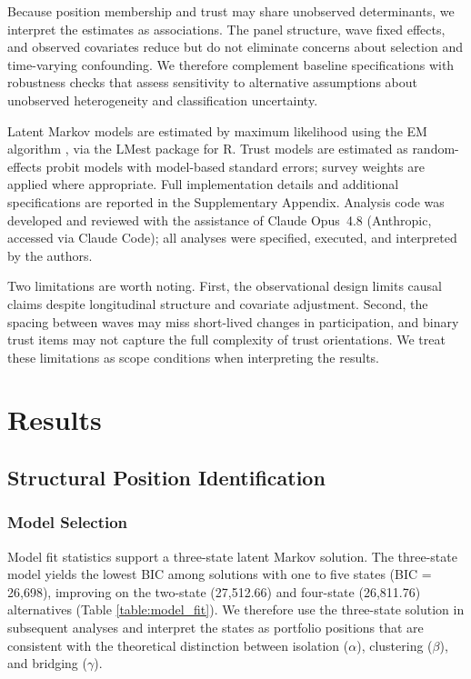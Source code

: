 Because position membership and trust may share unobserved determinants, we interpret the estimates as associations. The panel structure, wave fixed effects, and observed covariates reduce but do not eliminate concerns about selection and time-varying confounding. We therefore complement baseline specifications with robustness checks that assess sensitivity to alternative assumptions about unobserved heterogeneity and classification uncertainty.

Latent Markov models are estimated by maximum likelihood using the EM algorithm \parencite{bartolucci_latent_2013}, via the LMest package for R. Trust models are estimated as random-effects probit models with model-based standard errors; survey weights are applied where appropriate. Full implementation details and additional specifications are reported in the Supplementary Appendix. Analysis code was developed and reviewed with the assistance of Claude Opus~4.8 (Anthropic, accessed via Claude Code); all analyses were specified, executed, and interpreted by the authors.

Two limitations are worth noting. First, the observational design limits causal claims despite longitudinal structure and covariate adjustment. Second, the spacing between waves may miss short-lived changes in participation, and binary trust items may not capture the full complexity of trust orientations. We treat these limitations as scope conditions when interpreting the results.

\section{Results}

\subsection{Structural Position Identification}

\subsubsection{Model Selection}

Model fit statistics support a three-state latent Markov solution. The three-state model yields the lowest BIC among solutions with one to five states (BIC = 26{,}698), improving on the two-state (27{,}512.66) and four-state (26{,}811.76) alternatives (Table \ref{table:model_fit}). We therefore use the three-state solution in subsequent analyses and interpret the states as portfolio positions that are consistent with the theoretical distinction between isolation ($\alpha$), clustering ($\beta$), and bridging ($\gamma$).

